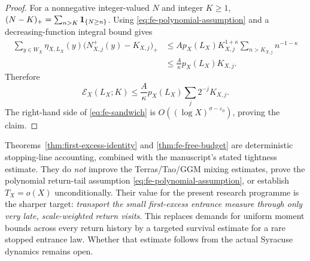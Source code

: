 \begin{proof}
For a nonnegative integer-valued $N$ and integer $K\ge1$,
$(N-K)_+=\sum_{n>K}{\bf1}_{\{N\ge n\}}$.  Using
\eqref{eq:fe-polynomial-assumption} and a decreasing-function
integral bound gives
\[
 \begin{aligned}
 \sum_{y\in W_X}\eta_{X,L_X}(y)
      \bigl(N^+_{X,j}(y)-K_{X,j}\bigr)_+
 &\le A p_X(L_X)K_{X,j}^{1+\kappa}
          \sum_{n>K_{X,j}}n^{-1-\kappa}\\
 &\le \frac{A}{\kappa}p_X(L_X)K_{X,j}.
 \end{aligned}
\]
Therefore
\[
\mathcal E_X(L_X;K)\le\frac{A}{\kappa}p_X(L_X)
  \sum_j2^{-j}K_{X,j}.
\]
The right-hand side of \eqref{eq:fe-sandwich} is
$O((\log X)^{\sigma-\varepsilon_0})$, proving the claim.
\end{proof}

\begin{remark}
\label{rem:fe-scope}
Theorems~\ref{thm:first-excess-identity} and
\ref{thm:fe-free-budget} are deterministic stopping-line accounting,
combined with the manuscript's stated tightness estimate.  They do
\emph{not} improve the Terras/Tao/GGM mixing estimates, prove the
polynomial return-tail assumption \eqref{eq:fe-polynomial-assumption},
or establish $T_X=o(X)$ unconditionally.  Their value for the
present research programme is the sharper target:
\emph{transport the small first-excess entrance measure through only
very late, scale-weighted return visits}.  This replaces demands for
uniform moment bounds across every return history by a targeted
survival estimate for a rare stopped entrance law.  Whether that
estimate follows from the actual Syracuse dynamics remains open.
\end{remark}
